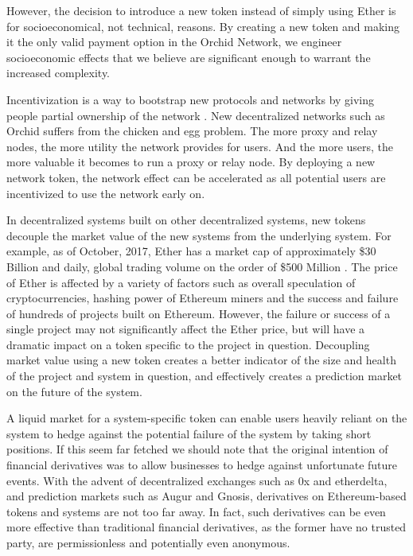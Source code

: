 However, the decision to introduce a new token instead of simply using Ether is for socioeconomical, not technical, reasons. By creating a new token and making it the only valid payment option in the Orchid Network, we engineer socioeconomic effects that we believe are significant enough to warrant the increased complexity.

Incentivization is a way to bootstrap new protocols and networks by giving people partial ownership of the network \cite{AppCoins}. New decentralized networks such as Orchid suffers from the chicken and egg problem. The more proxy and relay nodes, the more utility the network provides for users. And the more users, the more valuable it becomes to run a proxy or relay node. By deploying a new network token, the network effect can be accelerated as all potential users are incentivized to use the network early on.

In decentralized systems built on other decentralized systems, new tokens decouple the market value of the new systems from the underlying system. For example, as of October, 2017, Ether has a market cap of approximately \$30 Billion and daily, global trading volume on the order of \$500 Million \cite{onchainfx}. The price of Ether is affected by a variety of factors such as overall speculation of cryptocurrencies, hashing power of Ethereum miners and the success and failure of hundreds of projects built on Ethereum. However, the failure or success of a single project may not significantly affect the Ether price, but will have a dramatic impact on a token specific to the project in question. Decoupling market value using a new token creates a better indicator of the size and health of the project and system in question, and effectively creates a prediction market on the future of the system.

A liquid market for a system-specific token can enable users heavily reliant on the system to hedge against the potential failure of the system by taking short positions. If this seem far fetched we should note that the original intention of financial derivatives was to allow businesses to hedge against unfortunate future events. With the advent of decentralized exchanges such as 0x\cite{ETH0x} and etherdelta\cite{EtherDelta}, and prediction markets such as Augur\cite{Augur} and Gnosis\cite{Gnosis}, derivatives on Ethereum-based tokens and systems are not too far away. In fact, such derivatives can be even more effective\cite{ETHDerivatives} than traditional financial derivatives, as the former have no trusted party, are permissionless and potentially even anonymous.

